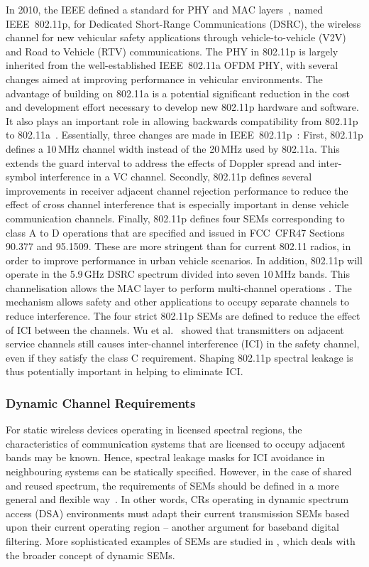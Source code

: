 In 2010, the IEEE defined a standard for PHY and MAC layers~\cite{802-11p2010}, named IEEE~802.11p, for Dedicated Short-Range Communications (DSRC), the wireless channel for new vehicular safety applications through vehicle-to-vehicle (V2V) and Road to Vehicle (RTV) communications.
The PHY in 802.11p is largely inherited from the well-established IEEE~802.11a OFDM PHY, with several changes aimed at improving performance in vehicular environments.
The advantage of building on 802.11a is a potential significant reduction in the cost and development effort necessary to develop new 802.11p hardware and software.
It also plays an important role in allowing backwards compatibility from 802.11p to 802.11a~\cite{Vandenberghe2011,Fernandez2012}.
Essentially, three changes are made in IEEE~802.11p~\cite{Jiang2008}:
First, 802.11p defines a 10\,MHz channel width instead of the 20\,MHz used by 802.11a.
This extends the guard interval to address the effects of Doppler spread and inter-symbol interference in a VC channel.
Secondly, 802.11p defines several improvements in receiver adjacent channel rejection performance to reduce the effect of cross channel interference that is especially important in dense vehicle communication channels.
Finally, 802.11p defines four SEMs corresponding to class A to D operations that are specified and issued in FCC~CFR47 Sections 90.377 and 95.1509.
These are more stringent than for current 802.11 radios, in order to improve performance in urban vehicle scenarios.
In addition, 802.11p will operate in the 5.9\,GHz DSRC spectrum divided into seven 10\,MHz bands.
This channelisation allows the MAC layer to perform multi-channel operations \cite{WAVE2010}.
The mechanism allows safety and other applications to occupy separate channels to reduce interference.
The four strict 802.11p SEMs are defined to reduce the effect of ICI between the channels. %
Wu et al.~\cite{Wu2013} showed that transmitters on adjacent service channels still causes inter-channel interference (ICI) in the safety channel, even if they satisfy the class C requirement.
Shaping 802.11p spectral leakage is thus potentially important in helping to eliminate ICI.

\subsubsection{Dynamic Channel Requirements}
For static wireless devices operating in licensed spectral regions, the characteristics of communication systems that are licensed to occupy adjacent bands may be known.
Hence, spectral leakage masks for ICI avoidance in neighbouring systems can be statically specified.
However, in the case of shared and reused spectrum, the requirements of SEMs should be defined in a more general and flexible way~\cite{Macaluso2014}.
In other words, CRs operating in dynamic spectrum access (DSA) environments must adapt their current transmission SEMs based upon their current operating region -- another argument for baseband digital filtering.
More sophisticated examples of SEMs are studied in \cite{Forde2010}, which deals with the broader concept of dynamic SEMs.

